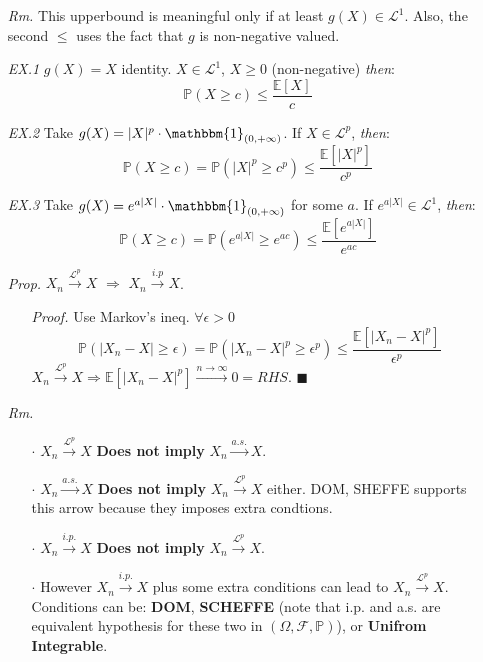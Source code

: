 \documentclass[a4paper,12pt,twoside]{book}
\begin{document}
\begin{itemize}

	\item[\textit{Rm.}] This upperbound is meaningful only if at least $g(X)\in \mathcal{L}^1$. Also, the second $\leq$ uses the fact that $g$ is non-negative valued.

	\item[\textit{EX.1}] $g(X)=X$ identity. $X\in \mathcal{L}^1$, $X\geq 0$ (non-negative) \textit{then}:
	\begin{equation}
		\mathbb{P}(X\geq c)\leq \frac{\mathbb{E}[X]}{c}
	\end{equation}

	\item[\textit{EX.2}] Take $g(X)=|X|^p \cdot \mathbbm{1}_{(0,+\infty)}$. If $X\in \mathcal{L}^p$, \textit{then}:
	\begin{equation}
		\mathbb{P}(X\geq c)= \mathbb{P}(|X|^p\geq c^p)\leq \frac{\mathbb{E}[|X|^p]}{c^p}
	\end{equation}

	\item[\textit{EX.3}] Take $g(X)=e^{a|X|} \cdot \mathbbm{1}_{(0,+\infty)}$ for some $a$. If $e^{a|X|}\in \mathcal{L}^1$, \textit{then}:
	\begin{equation}
		\mathbb{P}(X\geq c)= \mathbb{P}(e^{a|X|}\geq e^{ac})\leq \frac{\mathbb{E}[e^{a|X|}]}{e^{ac}}
	\end{equation}

	\item[\textit{Prop.}] $X_n \xrightarrow{\mathcal{L}^p} X$ $\Rightarrow$ $X_n \xrightarrow{i.p} X$.
	\begin{itemize}
		\item[\textit{Proof.}] Use Markov's ineq. $\forall \epsilon>0$
		\begin{equation}
			\mathbb{P}(|X_n-X|\geq \epsilon)=\mathbb{P}(|X_n-X|^p\geq \epsilon^p)\leq \frac{\mathbb{E}[|X_n-X|^p]}{\epsilon^p}
		\end{equation}
		$X_n \xrightarrow{\mathcal{L}^p} X \Rightarrow \mathbb{E}[|X_n-X|^p] \xrightarrow{n\to \infty}0=RHS$. $\blacksquare$
	\end{itemize}

	\item[\textit{Rm.}] 
		\begin{itemize}
			\item[$\cdot$] $X_n \xrightarrow{\mathcal{L}^p} X$ \textbf{Does not imply} $X_n \xrightarrow{a.s.} X$.
			\item[$\cdot$] $X_n \xrightarrow{a.s.} X$ \textbf{Does not imply} $X_n \xrightarrow{\mathcal{L}^p} X$ either. DOM, SHEFFE supports this arrow because they imposes extra condtions.
			\item[$\cdot$] $X_n \xrightarrow{i.p.} X$ \textbf{Does not imply} $X_n \xrightarrow{\mathcal{L}^p} X$.
			\item[$\cdot$] However $X_n \xrightarrow{i.p.} X$ plus some extra conditions can lead to $X_n \xrightarrow{\mathcal{L}^p} X$. Conditions can be: \textbf{DOM}, \textbf{SCHEFFE} (note that i.p. and a.s. are equivalent hypothesis for these two in $(\Omega, \mathcal{F}, \mathbb{P})$), or \textbf{Unifrom Integrable}.
		\end{itemize}
\end{itemize}
\end{document}
